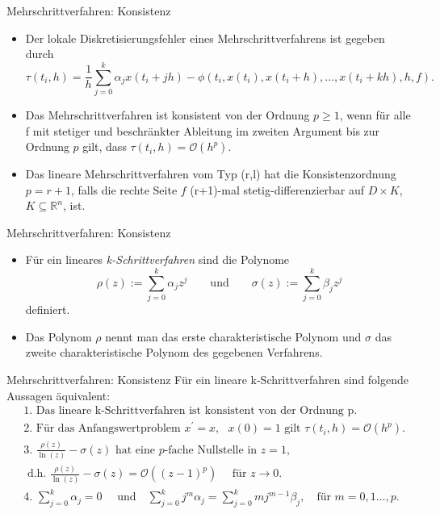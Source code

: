 \begin{frame}{Mehrschrittverfahren: Konsistenz}
    \begin{itemize}
        \item<1-> Der lokale Diskretisierungsfehler eines Mehrschrittverfahrens ist gegeben durch
        \[
            \tau(t_i,h) = \frac{1}{h} \sum_{j=0}^{k} \alpha_j x(t_i + jh) -
            \phi (t_i,x(t_i), x(t_i+h), \dots, x(t_i+kh),h,f).
        \]
        \item<2-> Das Mehrschrittverfahren ist konsistent von der Ordnung $p\geq 1$, wenn für alle f mit
        stetiger und beschränkter Ableitung im zweiten Argument bis zur Ordnung $p$ gilt, dass
        $\tau(t_i,h) = \mathcal{O}(h^p)$.
        \item<3-> Das lineare Mehrschrittverfahren vom Typ (r,l) hat die Konsistenzordnung $p=r+1$, falls die rechte
        Seite $f$ (r+1)-mal stetig-differenzierbar auf $D \times K$, $K\subseteq \mathbb{R}^n$, ist.
    \end{itemize}
\end{frame}

\begin{frame}{Mehrschrittverfahren: Konsistenz}
    \begin{itemize}
        \item<1-> Für ein lineares \textit{k-Schrittverfahren} sind die Polynome
        \[
            \rho(z) := \sum_{j=0}^{k} \alpha_j z^j \qquad \text{und} \qquad \sigma(z) := \sum_{j=0}^{k} \beta_j z^j
        \]
        definiert.
        \item<2-> Das Polynom $\rho$ nennt man das erste charakteristische Polynom und $\sigma$ das zweite charakteristische
    Polynom des gegebenen Verfahrens.
    \end{itemize}
\end{frame}

\begin{frame}{Mehrschrittverfahren: Konsistenz}
    Für ein lineare k-Schrittverfahren sind folgende Aussagen äquivalent:
    \begin{align*}
        &\text{1. Das lineare k-Schrittverfahren ist konsistent von der Ordnung p.}\\
        &\text{2. Für das Anfangswertproblem }
        x^{\prime} = x, \text{ }
        x(0) = 1
        \text{ gilt } \tau(t_i,h) = \mathcal{O}(h^p).\\
        &\text{3. } \frac{\rho(z)}{\ln(z)} - \sigma(z) \text{ hat eine $p$-fache Nullstelle in } z= 1,\\
        &\text{ d.h. }
        \frac{\rho(z)}{\ln(z)} - \sigma(z) = \mathcal{O}((z-1)^p) \quad \text{ für } z \rightarrow 0.\\
        &\text{4. } \sum_{j=0}^{k} \alpha_j = 0 \quad \text{ und} \quad
        \sum_{j=0}^{k} j^m \alpha_j = \sum_{j=0}^{k} mj^{m-1} \beta_j,  \quad \text{für } m=0,1 \dots, p.
    \end{align*}
\end{frame}

